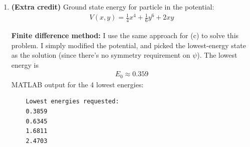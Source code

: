 \documentclass{article}
\theoremstyle{definition}
\newcommand{\f}[2]{\frac{#1}{#2}}
\begin{document}
\begin{enumerate}[label=(\alph*)]
\begin{lstlisting}
	% setting up potential
	[X,Y] = meshgrid(x,y);
	% harmonic potential 
	% U = X.^2/2 + Y.^2/2;
	% strange potential
	U = X.^2/2 + Y.^2/2 - sqrt(2)*abs(X-Y);
	
	% Total Hamiltonian.
	H = sparse(-(1/2)*(hbar^2/m)*Lap + diag(U(:))) ; 
	% Find lowest nmodes eigenvectors and eigenvalues of sparse matrix.
	nmodes = 4; 
	[Psi,E] = eigs(H,nmodes,'SM'); % find two smallest eigenvalues
	[E,ind] = sort(diag(E)); % convert E to vector and sort low to high.
	Psi = Psi(:,ind); % rearrange corresponding eigenvectors.

	% display all energies
	disp('Lowest energies requested: ')
	disp(E)
	
	%%%%%%%%%%%%%%%%%%%%%%% Normalization %%%%%%%%%%%%%%%%%%%%%%%%%
	for i=1:nmodes
	psi_temp = reshape(Psi(:,i),N,N);
	psi_result(:,:,i) = psi_temp / sqrt( trapz(y',trapz(x,abs(psi_temp).^2 ,2) , 1 ));  
	end
	
	%%% NOTE: want antisymmetric \psi, so pick eigenstate #3 to plot 
	
	% plot |psi|^2 for ground state only
	figure(1)
	surf(X,Y,abs(psi_result(:,:,3)).^2, 'LineWidth',0.1,'edgecolor','black', 'EdgeAlpha', 0.0 , 'FaceAlpha',1)
	title('|\psi|^2(x,y)')
	xlabel('x')
	ylabel('y')
	
	% plot \psi for ground state only
	figure(2)
	surf(X,Y,psi_result(:,:,3), 'LineWidth',0.1,'edgecolor','black', 'EdgeAlpha', 0.0 , 'FaceAlpha',1)
	view([0 0 90])
	colorbar;
	title('Antisymmetric \psi(x,y)')
	xlabel('x')
	ylabel('y')
	\end{lstlisting}
	
	\textbf{\textcolor{purple}{How would one do this problem variationally? I could imagine picking sines and cosines as basis functions, but setting up the solver and minimizing the Rayleigh-Ritz quotient seem very involved. Or maybe not... I haven't tried.}}
	
	
	
	
	\item \textbf{(Extra credit)} Ground state energy for particle in the potential:
	\begin{align*}
	V(x,y) = \f{1}{4}x^4 + \f{1}{6}y^6 + 2xy
	\end{align*}
	
	\textbf{Finite difference method:} I use the same approach for (c) to solve this problem. I simply modified the potential, and picked the lowest-energy state as the solution (since there's no symmetry requirement on $\psi$). The lowest energy is 
	\begin{align*}
	\boxed{E_0 \approx 0.359}
	\end{align*}
	MATLAB output for the 4 lowest energies:
	\begin{lstlisting}
	Lowest energies requested: 
	0.3859
	0.6345
	1.6811
	2.4703
	\end{lstlisting}
	

\end{enumerate}
\end{document}
